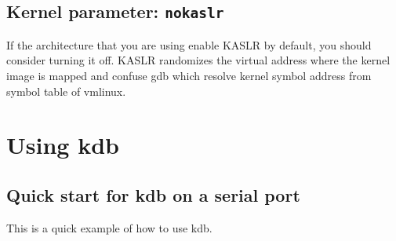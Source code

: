 \documentclass[a4paper,8pt,english]{sphinxmanual}
\begin{document}
\subsection{Kernel parameter: \texttt{nokaslr}}
\label{dev-tools/kgdb:kernel-parameter-nokaslr}
If the architecture that you are using enable KASLR by default,
you should consider turning it off.  KASLR randomizes the
virtual address where the kernel image is mapped and confuse
gdb which resolve kernel symbol address from symbol table
of vmlinux.


\section{Using kdb}
\label{dev-tools/kgdb:using-kdb}

\subsection{Quick start for kdb on a serial port}
\label{dev-tools/kgdb:quick-start-for-kdb-on-a-serial-port}
This is a quick example of how to use kdb.
\end{document}
